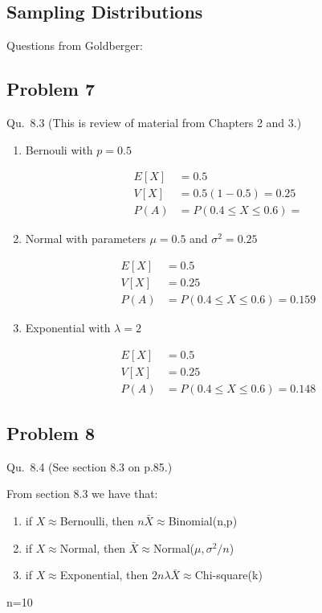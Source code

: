 \documentclass{article}
\newcommand{\1}{\mathbf{1}}
\begin{document}
\newpage
\subsection*{Sampling Distributions}
Questions from Goldberger:

\subsection*{Problem 7}
Qu.~8.3 (This is review of material from Chapters 2 and 3.)

\begin{enumerate}
    \item Bernouli with $p=0.5$
    
    \begin{align*}
        E[X] &= 0.5 \\
        V[X] &= 0.5(1-0.5) = 0.25 \\
        P(A) &= P(0.4\leq X \leq 0.6) = 
    \end{align*}
    
    \item Normal with parameters $\mu=0.5$ and $\sigma^2=0.25$
    
    \begin{align*}
        E[X] &= 0.5 \\
        V[X] &= 0.25 \\
        P(A) &= P(0.4\leq X \leq 0.6) = 0.159
    \end{align*}
    
    \item Exponential with $\lambda=2$
    
    \begin{align*}
        E[X] &= 0.5 \\
        V[X] &= 0.25 \\
        P(A) &= P(0.4\leq X \leq 0.6) = 0.148
    \end{align*}
\end{enumerate}


\newpage
\subsection*{Problem 8}
Qu.~8.4  (See section 8.3 on p.85.)

From section 8.3 we have that:
\begin{enumerate}
    \item if $X\approx$Bernoulli, then $n\bar X\approx$Binomial(n,p)
    \item if $X\approx$Normal, then $\bar X\approx$Normal($\mu, \sigma^2/n$)
    \item if $X\approx$Exponential, then $2n\lambda \bar X\approx$Chi-square(k)
\end{enumerate}
 n=10
 
\end{document}
